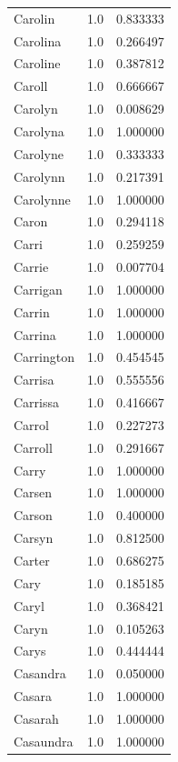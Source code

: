 \documentclass[
  letterpaper,
  DIV=11,
  numbers=noendperiod]{scrreprt}
\begin{document}
\begin{tabular}{lrr}
Carolin         &   1.0 &   0.833333 \\
Carolina        &   1.0 &   0.266497 \\
Caroline        &   1.0 &   0.387812 \\
Caroll          &   1.0 &   0.666667 \\
Carolyn         &   1.0 &   0.008629 \\
Carolyna        &   1.0 &   1.000000 \\
Carolyne        &   1.0 &   0.333333 \\
Carolynn        &   1.0 &   0.217391 \\
Carolynne       &   1.0 &   1.000000 \\
Caron           &   1.0 &   0.294118 \\
Carri           &   1.0 &   0.259259 \\
Carrie          &   1.0 &   0.007704 \\
Carrigan        &   1.0 &   1.000000 \\
Carrin          &   1.0 &   1.000000 \\
Carrina         &   1.0 &   1.000000 \\
Carrington      &   1.0 &   0.454545 \\
Carrisa         &   1.0 &   0.555556 \\
Carrissa        &   1.0 &   0.416667 \\
Carrol          &   1.0 &   0.227273 \\
Carroll         &   1.0 &   0.291667 \\
Carry           &   1.0 &   1.000000 \\
Carsen          &   1.0 &   1.000000 \\
Carson          &   1.0 &   0.400000 \\
Carsyn          &   1.0 &   0.812500 \\
Carter          &   1.0 &   0.686275 \\
Cary            &   1.0 &   0.185185 \\
Caryl           &   1.0 &   0.368421 \\
Caryn           &   1.0 &   0.105263 \\
Carys           &   1.0 &   0.444444 \\
Casandra        &   1.0 &   0.050000 \\
Casara          &   1.0 &   1.000000 \\
Casarah         &   1.0 &   1.000000 \\
Casaundra       &   1.0 &   1.000000 \\

\end{tabular}
\end{document}

